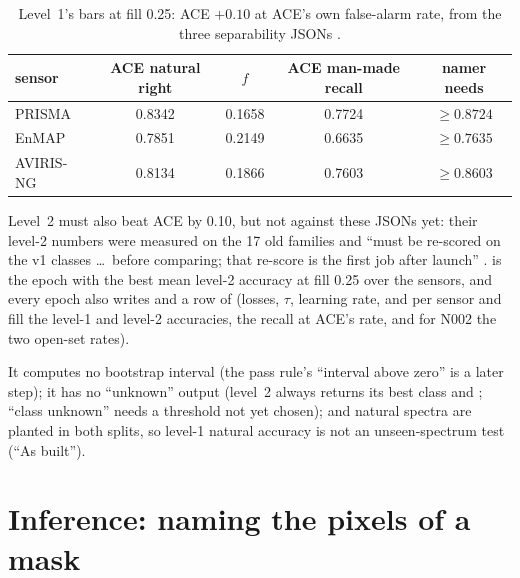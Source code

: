\begin{table}[htbp]
\centering\small
\begin{tabular}{lcccc}
\toprule
sensor & ACE natural right & $f$ & ACE man-made recall & namer needs\\
\midrule
PRISMA & 0.8342 & 0.1658 & 0.7724 & $\ge0.8724$\\
EnMAP & 0.7851 & 0.2149 & 0.6635 & $\ge0.7635$\\
AVIRIS-NG & 0.8134 & 0.1866 & 0.7603 & $\ge0.8603$\\
\bottomrule
\end{tabular}
\caption{Level~1's bars at fill 0.25: ACE $+0.10$ at ACE's own false-alarm rate, from the three separability JSONs
\tagC.}
\label{tab:namer:bars}
\end{table}

Level~2 must also beat ACE by 0.10, but not against these JSONs yet: their level-2 numbers were measured on the 17 old
families and ``must be re-scored on the v1 classes \dots\ before comparing; that re-score is the first job after
launch'' .  is the epoch with the best mean
level-2 accuracy at fill 0.25 over the sensors, and every epoch also writes  and a row of
 (losses, $\tau$, learning rate, and per sensor and fill the level-1 and level-2 accuracies, the
recall at ACE's rate, and for N002 the two open-set rates).

\begin{sourcenote}
It computes no bootstrap interval (the pass rule's ``interval above zero'' is a later step); it has no ``unknown''
output (level~2 always returns its best class and ; ``class unknown'' needs a threshold not yet chosen);
and natural spectra are planted in both splits, so level-1 natural accuracy is not an unseen-spectrum test (``As
built'').
\end{sourcenote}

\section{Inference: naming the pixels of a mask}\label{sec:namer:infer}

